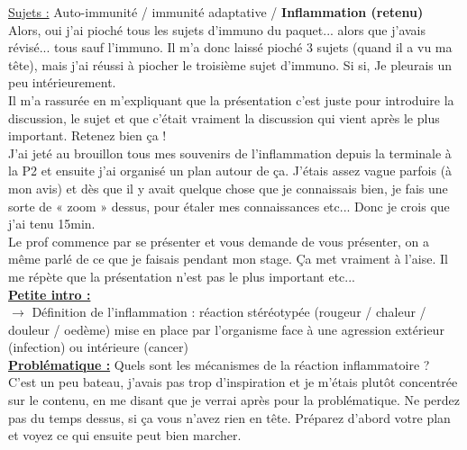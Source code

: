 \lettrine{{\color{yellow!80!black} \oldpilcrowfive}}{}
\uline{Sujets :} Auto-immunité / immunité adaptative / \textbf{Inflammation (retenu)}\\
Alors, oui j’ai pioché tous les sujets d’immuno du paquet... alors que j’avais révisé... tous sauf l’immuno. Il m’a donc laissé pioché 3 sujets (quand il a vu ma tête), mais j’ai réussi à piocher le troisième sujet d’immuno. Si si, Je pleurais un peu intérieurement.\\
Il m’a rassurée en m’expliquant que la présentation c’est juste pour introduire la discussion, le sujet et que c’était vraiment la discussion qui vient après le plus important. Retenez bien ça !\\
J’ai jeté au brouillon tous mes souvenirs de l’inflammation depuis la terminale à la P2 et ensuite j’ai organisé un plan autour de ça. J’étais assez vague parfois (à mon avis) et dès que il y avait quelque chose que je connaissais bien, je fais une sorte de « zoom » dessus, pour étaler mes connaissances etc... Donc je crois que j’ai tenu 15min.\\
Le prof commence par se présenter et vous demande de vous présenter, on a même parlé de ce que je faisais pendant mon stage. Ça met vraiment à l’aise. Il me répète que la présentation n’est pas le plus important etc...\\

\uline{\textbf{Petite intro :}} \\
$\longrightarrow$ Définition de l’inflammation : réaction stéréotypée (rougeur / chaleur / douleur / oedème) mise en place par l’organisme face à une agression extérieur (infection) ou intérieure (cancer)\\

\uline{\textbf{Problématique :}} Quels sont les mécanismes de la réaction inflammatoire ?\\
C’est un peu bateau, j’avais pas trop d’inspiration et je m’étais plutôt concentrée sur le contenu, en me disant que je verrai après pour la problématique. Ne perdez pas du temps dessus, si ça vous n’avez rien en tête. Préparez d’abord votre plan et voyez ce qui ensuite peut bien marcher.\\

